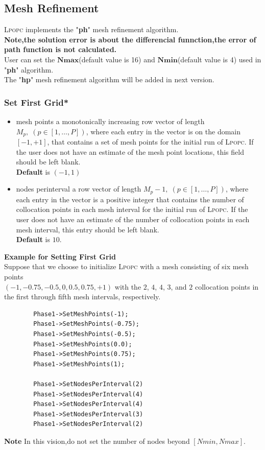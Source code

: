 \documentclass[10pt]{article}
\newcommand{\LPOPC}{\textsc{Lpopc}\xspace}
\begin{document}
	\subsection{Mesh Refinement}
	\LPOPC implements the "\textbf{ph}" mesh refinement algorithm\cite{Patterson2014a}.\\
	\textbf{Note,the solution error is about the differencial funnction,the error of path function is not calculated.}\\
	User can set the $\mathbf{Nmax}$(default value is 16) and $\mathbf{Nmin}$(default value is 4) used in "\textbf{ph}" algorithm.\\
	The "\textbf{hp}" mesh refinement algorithm will be added in next version.
	\subsubsection*{Set First Grid*}
		\begin{itemize}
			\item mesh points a monotonically increasing
			row vector of length $M_p,\; (p\in[1,\ldots,P])$, where each entry
			in the vector is on the domain $[-1,+1]$, that contains a set of
			mesh points for the initial run of \LPOPC.  If the user does not
			have an estimate of the mesh point locations, this field should be
			left blank.\\
			\textbf{Default} is $(-1,1)$
			\item nodes perinterval a row vector of length
			$M_p-1,\; (p\in[1,\ldots,P])$, where each entry in the vector is a
			positive integer that contains the number of collocation points in
			each mesh interval for the initial run of \LPOPC.  If the user does not
			have an estimate of the number of collocation points in each mesh
			interval, this entry should be left blank.\\
			\textbf{Default} is $10$.
		\end{itemize}
		\textbf{Example for Setting First Grid}\\
		
		Suppose that we choose to initialize \LPOPC
		with a mesh consisting of six mesh points\\
		$(-1,-0.75,-0.5,0,0.5,0.75,+1)$ with the $2$, $4$, $4$, $3$, and $2$
		collocation points in the first through fifth mesh intervals,
		respectively.
		\begin{lstlisting}
		Phase1->SetMeshPoints(-1);
		Phase1->SetMeshPoints(-0.75);
		Phase1->SetMeshPoints(-0.5);
		Phase1->SetMeshPoints(0.0);
		Phase1->SetMeshPoints(0.75);
		Phase1->SetMeshPoints(1);
		
		Phase1->SetNodesPerInterval(2)
		Phase1->SetNodesPerInterval(4)
		Phase1->SetNodesPerInterval(4)
		Phase1->SetNodesPerInterval(3)
		Phase1->SetNodesPerInterval(2)
	\end{lstlisting} 
	\textbf{Note} In this vision,do not set the number of nodes beyond $[Nmin,Nmax]$.
\end{document}

